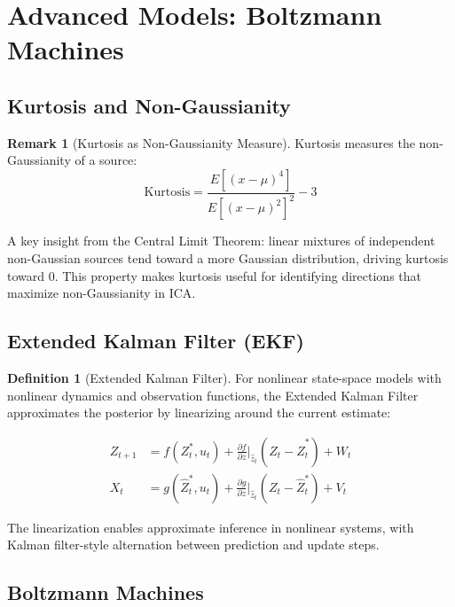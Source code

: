 \documentclass[12pt,a4paper]{article}
\theoremstyle{definition}
\newtheorem{definition}{Definition}[section]
\newtheorem{remark}{Remark}[section]
\begin{document}
\newpage

\section{Advanced Models: Boltzmann Machines}

\subsection{Kurtosis and Non-Gaussianity}

\begin{remark}[Kurtosis as Non-Gaussianity Measure]
Kurtosis measures the non-Gaussianity of a source:
\[
\text{Kurtosis} = \frac{E[(x-\mu)^4]}{E[(x-\mu)^2]^2} - 3
\]

A key insight from the Central Limit Theorem: linear mixtures of independent non-Gaussian sources tend toward a more Gaussian distribution, driving kurtosis toward 0. This property makes kurtosis useful for identifying directions that maximize non-Gaussianity in ICA.
\end{remark}

\subsection{Extended Kalman Filter (EKF)}

\begin{definition}[Extended Kalman Filter]
For nonlinear state-space models with nonlinear dynamics and observation functions, the Extended Kalman Filter approximates the posterior by linearizing around the current estimate:

\begin{align*}
Z_{t+1} &= f(Z_t^*, u_t) + \frac{\partial f}{\partial z}\bigg|_{\hat{z}_t} (Z_t - \hat{Z}_t^*) + W_t \\
X_t &= g(\hat{Z}_t^*, u_t) + \frac{\partial g}{\partial z}\bigg|_{\hat{z}_t} (Z_t - \hat{Z}_t^*) + V_t
\end{align*}

The linearization enables approximate inference in nonlinear systems, with Kalman filter-style alternation between prediction and update steps.
\end{definition}

\subsection{Boltzmann Machines}
\end{document}
